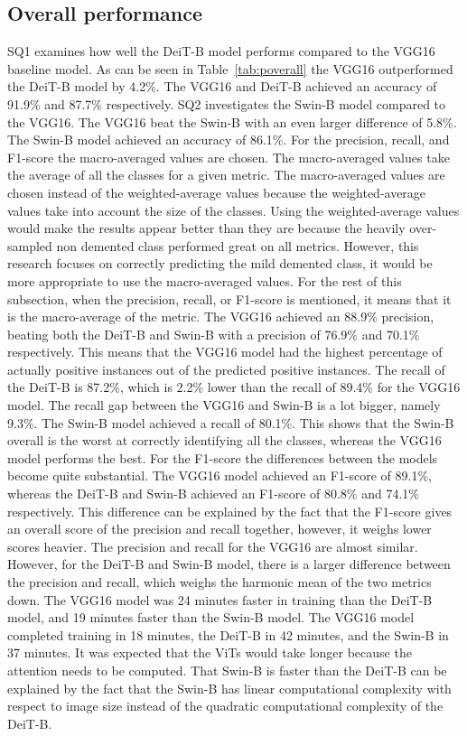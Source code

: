 \documentclass[11pt, a4paper]{article}
\begin{document}
\subsection{Overall performance} \label{subs:overall}
SQ1 examines how well the DeiT-B model performs compared to the VGG16 baseline model. As can be seen in Table~\ref{tab:poverall} the VGG16 outperformed the DeiT-B model by 4.2\%. The VGG16 and DeiT-B achieved an accuracy of 91.9\% and 87.7\% respectively. SQ2 investigates the Swin-B model compared to the VGG16. The VGG16 beat the Swin-B with an even larger difference of 5.8\%. The Swin-B model achieved an accuracy of 86.1\%. For the precision, recall, and F1-score the macro-averaged values are chosen. The macro-averaged values take the average of all the classes for a given metric. The macro-averaged values are chosen instead of the weighted-average values because the weighted-average values take into account the size of the classes. Using the weighted-average values would make the results appear better than they are because the heavily over-sampled non demented class performed great on all metrics. However, this research focuses on correctly predicting the mild demented class, it would be more appropriate to use the macro-averaged values. For the rest of this subsection, when the precision, recall, or F1-score is mentioned, it means that it is the macro-average of the metric. The VGG16 achieved an 88.9\% precision, beating both the DeiT-B and Swin-B with a precision of 76.9\% and 70.1\% respectively. This means that the VGG16 model had the highest percentage of actually positive instances out of the predicted positive instances. The recall of the DeiT-B is 87.2\%, which is 2.2\% lower than the recall of 89.4\% for the VGG16 model. The recall gap between the VGG16 and Swin-B is a lot bigger, namely 9.3\%. The Swin-B model achieved a recall of 80.1\%. This shows that the Swin-B overall is the worst at correctly identifying all the classes, whereas the VGG16 model performs the best. For the F1-score the differences between the models become quite substantial. The VGG16 model achieved an F1-score of 89.1\%, whereas the DeiT-B and Swin-B achieved an F1-score of 80.8\% and 74.1\% respectively. This difference can be explained by the fact that the F1-score gives an overall score of the precision and recall together, however, it weighs lower scores heavier. The precision and recall for the VGG16 are almost similar. However, for the DeiT-B and Swin-B model, there is a larger difference between the precision and recall, which weighs the harmonic mean of the two metrics down. The VGG16 model was 24 minutes faster in training than the DeiT-B model, and 19 minutes faster than the Swin-B model. The VGG16 model completed training in 18 minutes, the DeiT-B in 42 minutes, and the Swin-B in 37 minutes. It was expected that the ViTs would take longer because the attention needs to be computed. That Swin-B is faster than the DeiT-B can be explained by the fact that the Swin-B has linear computational complexity with respect to image size instead of the quadratic computational complexity of the DeiT-B.
\end{document}
